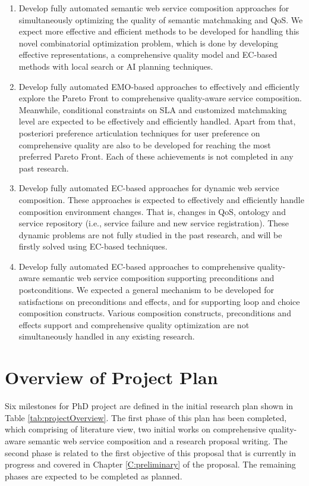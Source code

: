 \begin{enumerate}
 \item Develop fully automated semantic web service composition approaches for simultaneously optimizing the quality of semantic matchmaking and QoS. We expect more effective and efficient methods to be developed for handling this novel combinatorial optimization problem, which is done by developing effective representations, a comprehensive quality model and EC-based methods with local search or AI planning techniques.

\item Develop fully automated EMO-based approaches to effectively and efficiently explore the Pareto Front to comprehensive quality-aware service composition. Meanwhile, conditional constraints on SLA and customized matchmaking level are expected to be effectively and efficiently handled. Apart from that, posteriori preference articulation techniques for user preference on comprehensive quality are also to be developed for reaching the most preferred Pareto Front. Each of these achievements is not completed in any past research.

\item Develop fully automated EC-based approaches for dynamic web service composition. These approaches is expected to effectively and efficiently handle composition environment changes. That is, changes in QoS, ontology and service repository (i.e., service failure and new service registration). These dynamic problems are not fully studied in the past research, and will be firstly solved using EC-based techniques.

\item Develop fully automated EC-based approaches to comprehensive quality-aware semantic web service composition supporting preconditions and postconditions. We expected a general mechanism to be developed for satisfactions on preconditions and effects, and for supporting loop and choice composition constructs. Various composition constructs, preconditions and effects support and comprehensive quality optimization are not simultaneously handled in any existing research.
\end{enumerate}

\section{Overview of Project Plan}

Six milestones for PhD project are defined in the initial research plan shown in Table \ref{tab:projectOverview}. The first phase of this plan has been completed, which comprising of literature view, two initial works on comprehensive quality-aware semantic web service composition and a research proposal writing. The second phase is related to the first objective of this proposal that is currently in progress and covered in Chapter \ref{C:preliminary} of the proposal. The remaining phases are expected to be completed as planned.

